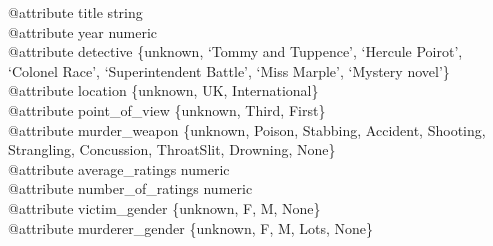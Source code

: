 \documentclass{mproj}
\begin{document}
@attribute title string\\
@attribute year numeric\\
@attribute detective \{unknown, `Tommy and Tuppence', `Hercule Poirot', `Colonel Race', `Superintendent Battle', `Miss Marple', `Mystery novel'\}\\
@attribute location \{unknown, UK, International\}\\
@attribute point\_of\_view \{unknown, Third, First\}\\
@attribute murder\_weapon \{unknown, Poison, Stabbing, Accident, Shooting, Strangling, Concussion, ThroatSlit, Drowning, None\}\\
@attribute average\_ratings numeric\\
@attribute number\_of\_ratings numeric\\
@attribute victim\_gender \{unknown, F, M, None\}\\
@attribute murderer\_gender \{unknown, F, M, Lots, None\}
\end{document}
